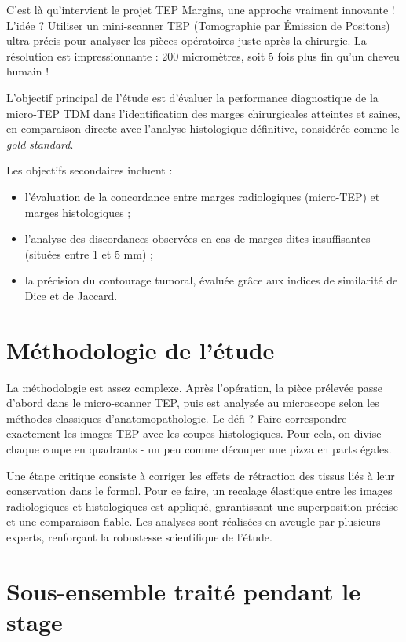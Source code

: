 \documentclass[11pt,a4paper]{report}
\begin{document}
C'est là qu'intervient le projet TEP Margins, une approche vraiment innovante ! L'idée ? Utiliser un mini-scanner TEP (Tomographie par Émission de Positons) ultra-précis pour analyser les pièces opératoires juste après la chirurgie. La résolution est impressionnante : 200 micromètres, soit 5 fois plus fin qu'un cheveu humain !

L'objectif principal de l'étude est d'évaluer la performance diagnostique de la micro-TEP TDM dans l'identification des marges chirurgicales atteintes et saines, en comparaison directe avec l'analyse histologique définitive, considérée comme le \textit{gold standard}.

Les objectifs secondaires incluent :
\begin{itemize}
\item l'évaluation de la concordance entre marges radiologiques (micro-TEP) et marges histologiques ;
\item l'analyse des discordances observées en cas de marges dites insuffisantes (situées entre 1 et 5 mm) ;
\item la précision du contourage tumoral, évaluée grâce aux indices de similarité de Dice et de Jaccard.
\end{itemize}

\section{Méthodologie de l'étude}

La méthodologie est assez complexe. Après l'opération, la pièce prélevée passe d'abord dans le micro-scanner TEP, puis est analysée au microscope selon les méthodes classiques d'anatomopathologie. Le défi ? Faire correspondre exactement les images TEP avec les coupes histologiques. Pour cela, on divise chaque coupe en quadrants - un peu comme découper une pizza en parts égales.

Une étape critique consiste à corriger les effets de rétraction des tissus liés à leur conservation dans le formol. Pour ce faire, un recalage élastique entre les images radiologiques et histologiques est appliqué, garantissant une superposition précise et une comparaison fiable. Les analyses sont réalisées en aveugle par plusieurs experts, renforçant la robustesse scientifique de l'étude.

\section{Sous-ensemble traité pendant le stage}
\end{document}
